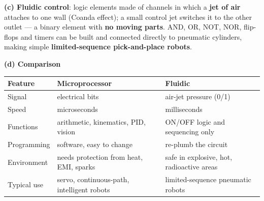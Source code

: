 \documentclass[11pt,a4paper]{article}
\begin{document}
\begin{enumerate}
\begin{answer}
			\textbf{(c) Fluidic control}: logic elements made of channels in which a \textbf{jet of air} attaches to one wall (Coanda effect); a small control jet switches it to the other outlet --- a binary element with \textbf{no moving parts}. AND, OR, NOT, NOR, flip-flops and timers can be built and connected directly to pneumatic cylinders, making simple \textbf{limited-sequence pick-and-place robots}.

			\textbf{(d) Comparison}
			\begin{center}
				\small
				\begin{tabular}{@{}p{3.0cm}p{5.4cm}p{5.4cm}@{}}
					\toprule
					\textbf{Feature} & \textbf{Microprocessor} & \textbf{Fluidic} \\
					\midrule
					Signal      & electrical bits            & air-jet pressure (0/1) \\
					Speed       & microseconds               & milliseconds \\
					Functions   & arithmetic, kinematics, PID, vision & ON/OFF logic and sequencing only \\
					Programming & software, easy to change   & re-plumb the circuit \\
					Environment & needs protection from heat, EMI, sparks & safe in explosive, hot, radioactive areas \\
					Typical use & servo, continuous-path, intelligent robots & limited-sequence pneumatic robots \\
					\bottomrule
				\end{tabular}
			\end{center}
		\end{answer}

	\end{enumerate}
\end{document}
